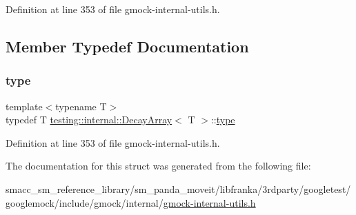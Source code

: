 Definition at line 353 of file gmock-\/internal-\/utils.\+h.



\subsection{Member Typedef Documentation}
\mbox{\label{structtesting_1_1internal_1_1DecayArray_a39803f9bafd56bc4531f86eb34fe9c0f}} 
\subsubsection{\texorpdfstring{type}{type}}
{\footnotesize\ttfamily template$<$typename T$>$ \\
typedef T \hyperlink{structtesting_1_1internal_1_1DecayArray}{testing\+::internal\+::\+Decay\+Array}$<$ T $>$\+::\hyperlink{structtesting_1_1internal_1_1DecayArray_a39803f9bafd56bc4531f86eb34fe9c0f}{type}}



Definition at line 353 of file gmock-\/internal-\/utils.\+h.



The documentation for this struct was generated from the following file\+:\begin{DoxyCompactItemize}
\item 
smacc\+\_\+sm\+\_\+reference\+\_\+library/sm\+\_\+panda\+\_\+moveit/libfranka/3rdparty/googletest/googlemock/include/gmock/internal/\hyperlink{gmock-internal-utils_8h}{gmock-\/internal-\/utils.\+h}\end{DoxyCompactItemize}
